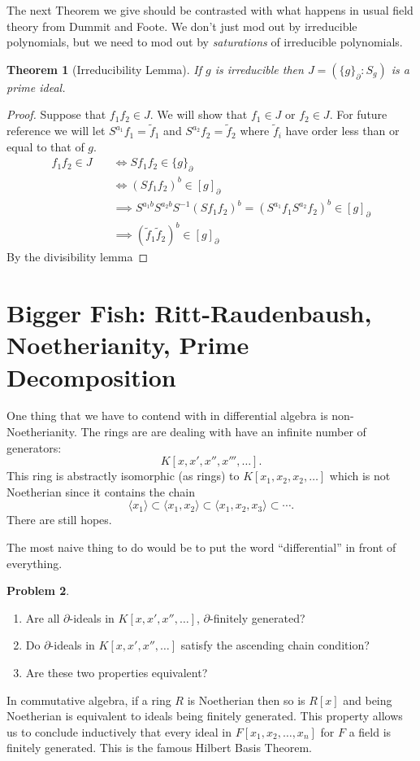 \documentclass[12pt]{book}
\numberwithin{equation}{section}
\newtheorem{theorem}{Theorem}[subsection]
\theoremstyle{definition}
\newtheorem{problem}[theorem]{Problem}
\theoremstyle{remark}
\begin{document}
The next Theorem we give should be contrasted with what happens in usual field theory from Dummit and Foote. 
We don't just mod out by irreducible polynomials, but we need to mod out by \emph{saturations} of irreducible polynomials. 
\begin{theorem}[Irreducibility Lemma]
If $g$ is irreducible then $J = ( \lbrace g \rbrace_{\partial} : S_g)$ is a prime ideal. 
\end{theorem}
\begin{proof}
	Suppose that $f_1f_2 \in J$.
	We will show that $f_1 \in J$ or $f_2 \in J$.
	For future reference we will let $S^{a_1}f_1 = \widetilde{f}_1$ and $S^{a_2}f_2 = \widetilde{f}_2$ where $\widetilde{f}_i$ have order less than or equal to that of $g$.
	\begin{align*} 
	f_1f_2 \in J \quad &\iff  S f_1f_2 \in \lbrace g \rbrace_{\partial} \\
	&\iff (Sf_1f_2)^b \in [g]_{\partial}\\
	&\implies S^{a_1b}S^{a_2b}S^{-1} (S f_1f_2)^b  = (S^{a_1}f_1 S^{a_2} f_2)^b \in [g]_{\partial} \\
	&\implies (\widetilde{f}_1\widetilde{f}_2)^b \in [g]_{\partial} 
	\end{align*}
	By the divisibility lemma
\end{proof}


\section{Bigger Fish: Ritt-Raudenbaush, Noetherianity, Prime Decomposition}

One thing that we have to contend with in differential algebra is non-Noetherianity. 
The rings are are dealing with have an infinite number of generators:
$$ K[x,x',x'',x''',\ldots].$$
This ring is abstractly isomorphic (as rings) to $K[x_1,x_2,x_2,\ldots]$ which is not Noetherian since it contains the chain 
$$\langle x_1 \rangle \subset \langle x_1,x_2\rangle \subset \langle x_1,x_2,x_3\rangle \subset \cdots.$$
There are still hopes.

The most naive thing to do would be to put the word ``differential'' in front of everything. 
\begin{problem}
	\begin{enumerate}
		\item Are all $\partial$-ideals in $K[x,x',x'',\ldots]$, $\partial$-finitely generated?
		\item Do $\partial$-ideals in $K[x,x',x'',\ldots]$ satisfy the ascending chain condition?
		\item Are these two properties equivalent?
	\end{enumerate}
\end{problem}
In commutative algebra, if a ring $R$ is Noetherian then so is $R[x]$ and being Noetherian is equivalent to ideals being finitely generated. 
This property allows us to conclude inductively that every ideal in $F[x_1,x_2,\ldots,x_n]$ for $F$ a field is finitely generated. 
This is the famous Hilbert Basis Theorem.
\end{document}
